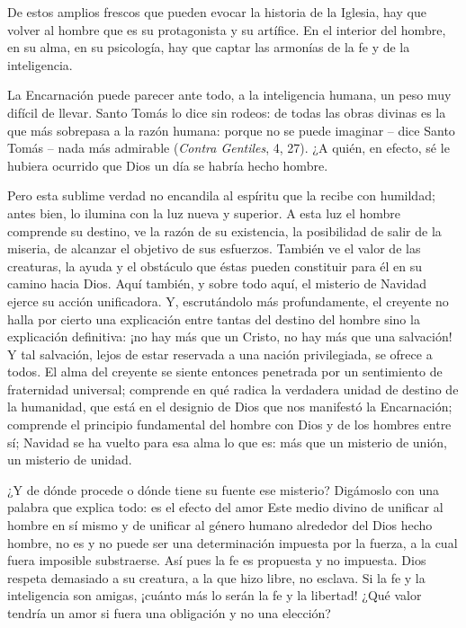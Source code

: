 De estos amplios frescos que pueden evocar la historia de la Iglesia, hay que volver al hombre que es su protagonista y su artífice. En el interior del hombre, en su alma, en su psicología, hay que captar las armonías de la fe y de la inteligencia.

La Encarnación puede parecer ante todo, a la inteligencia humana, un peso muy difícil de llevar. Santo Tomás lo dice sin rodeos: de todas las obras divinas es la que más sobrepasa a la razón humana: porque no se puede imaginar -- dice Santo Tomás -- nada más admirable (\emph{Contra Gentiles}, 4, 27). ¿A quién, en efecto, sé le hubiera ocurrido que Dios un día se habría hecho hombre.

Pero esta sublime verdad no encandila al espíritu que la recibe con humildad; antes bien, lo ilumina con la luz nueva y superior. A esta luz el hombre comprende su destino, ve la razón de su existencia, la posibilidad de salir de la miseria, de alcanzar el objetivo de sus esfuerzos. También ve el valor de las creaturas, la ayuda y el obstáculo que éstas pueden constituir para él en su camino hacia Dios. Aquí también, y sobre todo aquí, el misterio de Navidad ejerce su acción unificadora. Y, escrutándolo más profundamente, el creyente no halla por cierto una explicación entre tantas del destino del hombre sino la explicación definitiva: ¡no hay más que un Cristo, no hay más que una salvación! Y tal salvación, lejos de estar reservada a una nación privilegiada, se ofrece a todos. El alma del creyente se siente entonces penetrada por un sentimiento de fraternidad universal; comprende en qué radica la verdadera unidad de destino de la humanidad, que está en el designio de Dios que nos manifestó la Encarnación; comprende el principio fundamental del hombre con Dios y de los hombres entre sí; Navidad se ha vuelto para esa alma lo que es: más que un misterio de unión, un misterio de unidad.

¿Y de dónde procede o dónde tiene su fuente ese misterio? Digámoslo con una palabra que explica todo: es el efecto del amor Este medio divino de unificar al hombre en sí mismo y de unificar al género humano alrededor del Dios hecho hombre, no es y no puede ser una determinación impuesta por la fuerza, a la cual fuera imposible substraerse. Así pues la fe es propuesta y no impuesta. Dios respeta demasiado a su creatura, a la que hizo libre, no esclava. Si la fe y la inteligencia son amigas, ¡cuánto más lo serán la fe y la libertad! ¿Qué valor tendría un amor si fuera una obligación y no una elección?

